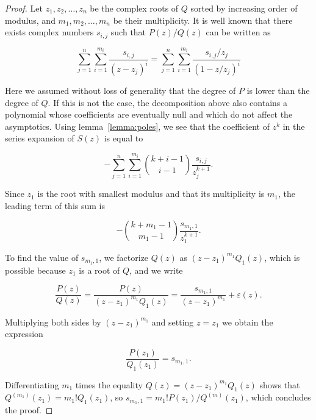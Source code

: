\documentclass{article}
\begin{document}
\begin{proof}
Let $z_1, z_2, \ldots, z_n$ be the complex roots of $Q$ sorted by
increasing order of modulus, and $m_1, m_2, \ldots, m_n$ be their
multiplicity. It is well known that there exists complex numbers $s_{i,j}$
such that $P(z)/Q(z)$ can be written as

\begin{equation}
\label{eq:fullass}
\sum_{j=1}^n \sum_{i=1}^{m_i} \frac{s_{i,j}}{(z-z_j)^i} =
\sum_{j=1}^n \sum_{i=1}^{m_i} \frac{s_{i,j}/z_j}{(1-z/z_j)^i}
\end{equation}

Here we assumed without loss of generality that the degree of $P$ is lower
than the degree of $Q$. If this is not the case, the decomposition above
also contains a polynomial whose coefficients are eventually null and
which do not affect the asymptotics. Using lemma~\ref{lemma:poles}, we see
that the coefficient of $z^k$ in the series expansion of $S(z)$ is equal
to

\begin{equation*}
-\sum_{j=1}^n \sum_{i=1}^{m_i}
{k+i-1 \choose i-1} \frac{s_{i,j}}{z_j^{k+1}}.
\end{equation*}

Since $z_1$ is the root with smallest modulus and that its multiplicity is
$m_1$, the leading term of this sum is

\begin{equation*}
-{k+m_1-1 \choose m_1-1} \frac{s_{m_1,1}}{z_1^{k+1}}.
\end{equation*}

To find the value of $s_{m_1,1}$, we factorize $Q(z)$ as
$(z-z_1)^{m_1}Q_1(z)$, which is possible because $z_1$ is a root of $Q$,
and we write

\begin{equation*}
\frac{P(z)}{Q(z)} =
\frac{P(z)}{(z-z_1)^{m_1}Q_1(z)} = \frac{s_{m_1,1}}{(z-z_1)^{m_1}} +
\varepsilon(z).
\end{equation*}

Multiplying both sides by $(z-z_1)^{m_1}$ and setting $z = z_1$ we obtain
the expression

\begin{equation*}
\frac{P(z_1)}{Q_1(z_1)} = s_{m_1,1}.
\end{equation*}

Differentiating $m_1$ times the equality $Q(z) = (z-z_1)^{m_1}Q_1(z)$
shows that $Q^{(m_1)}(z_1) = m_1!Q_1(z_1)$, so $s_{m_1,1} = m_1!P(z_1) /
Q^{(m)}(z_1)$, which concludes the proof.
\end{proof}
\end{document}
